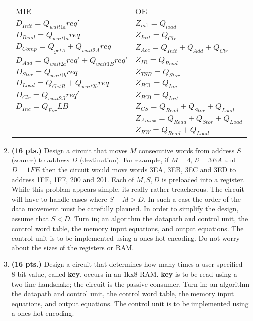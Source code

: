 \begin{enumerate}
\begin{onlysolution}
{\begin{tabular}{ll}
MIE                                     &       OE                      \\
$D_{Init}= Q_{wait1a}req'$            &  $Z_{m1} = Q_{load}$           \\
$D_{Read } = Q_{wait1a}req$             &  $Z_{Init} = Q_{Clr}$           \\
$D_{Comp}= Q_{getA} + Q_{wait2A}req$  &  $Z_{Acc} = Q_{Init} + Q_{Add} + Q_{Clr}$               \\
$D_{Add}= Q_{wait2a}req' + Q_{wait1B}req'$   &  $Z_{IR} = Q_{Read}$     \\
$D_{Stor} = Q_{wait1b}req$             &  $Z_{TSB} = Q_{Stor}$         \\
$D_{Load}= Q_{GetB} + Q_{wait2b}req$  &  $Z_{PC1} = Q_{Inc}$          \\
$D_{Clr  } = Q_{wait2B}req'$            &  $Z_{PC0} = Q_{Init}$          \\
$D_{Inc } = Q_{For}LB$                 &   $Z_{CS} = Q_{Read}+Q_{Stor}+Q_{Load}$     \\
                    &   $Z_{Amux} = Q_{Read}+Q_{Stor}+Q_{Load}$   \\
                    &   $Z_{RW} = Q_{Read}+Q_{Load}$            \\
\end{tabular}

}\end{onlysolution} 

\item \textbf{ (16 pts.)}
Design a circuit that moves $M$ consecutive words from address $S$ (source) to
address $D$ (destination).  For example, if $M=4$, $S=3EA$ and $D=1FE$ then the 
circuit would move words 3EA, 3EB, 3EC and 3ED to address 1FE, 1FF, 200 and 201.
Each of $M,S,D$ is preloaded into a register.  While this problem appears simple,
its really rather treacherous.  The circuit will have to handle cases where 
$S+M > D$.  In such a case the order of the data movement must be carefully planned.
In order to simplify the design, assume that $S<D$.  
Turn in; an algorithm the datapath and control unit, the control word 
table, the memory input equations, and output equations.  
The control unit is to be implemented using a ones hot encoding.
Do not worry about the sizes of the
registers or RAM.

\item \textbf{ (16 pts.)}
Design a circuit that determines how many times a user
specified 8-bit value, called \textbf{ key}, occurs in an 1kx8 RAM.  
\textbf{ key} is to be read using a two-line handshake; the circuit 
is the passive consumer.
Turn in; an algorithm the datapath and control unit, the control word 
table, the memory input equations, and output equations.  
The control unit is to be implemented using a ones hot encoding.



\end{enumerate}
